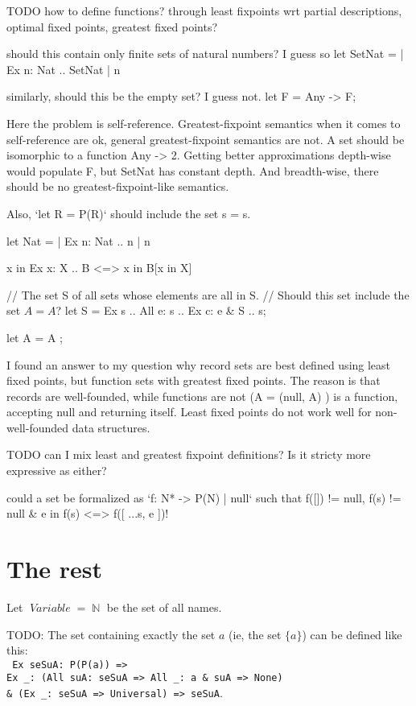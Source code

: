 \documentclass[oneside,12pt]{book}
\newcounter{question}
\theoremstyle{definition}
\theoremstyle{remark}
\newcommand{\tde}{\raisebox{0.5ex}{\texttildelow}}
\newcommand\var[1]{\mathop{\mathit{#1}}\nolimits}
\newcommand{\Variable}{\var{Variable}}
\newcommand{\Nat}{\var{\mathbb{N}}}
\begin{document}
TODO how to define functions?
through least fixpoints wrt partial descriptions, optimal fixed points,
greatest fixed points?

should this contain only finite sets of natural numbers? I guess so
let SetNat = {{}} | Ex n: Nat .. { SetNat | { n } }

similarly, should this be the empty set? I guess not.
let F = Any -> F;

Here the problem is self-reference. Greatest-fixpoint semantics when it comes
to self-reference are ok, general greatest-fixpoint semantics are not.
A set should be isomorphic to a function Any -> 2. Getting better approximations
depth-wise would populate F, but SetNat has constant depth. And breadth-wise,
there should be no greatest-fixpoint-like semantics.

Also, `let R = P(R)` should include the set s = {s}.

let Nat = {{}} | Ex n: Nat .. n | { n }

x in Ex x: X .. B <=> x in B[x in X]

// The set S of all sets whose elements are all in S.
// Should this set include the set $A = {A}$?
let S = Ex s .. All e: s .. Ex c: { e } \& S .. s;

let A = { A };

I found an answer to my question why record sets are best defined
using least fixed points, but function sets with greatest fixed points.
The reason is that records are well-founded, while functions are not
(A = { (null, A) }) is a function, accepting null and returning itself.
Least fixed points do not work well for non-well-founded data structures.

TODO can I mix least and greatest fixpoint definitions? Is it stricty more
expressive as either?

could a set be formalized as `f: N* -> P(N) | null` such that
f([]) != null,
f(s) != null \& e in f(s) <=> f([ ...s, e ])!

\section{The rest}

\begin{defBox}
  Let $\Variable = \Nat$ be the set of all names.
\end{defBox}

TODO: The set containing exactly the set $a$ (ie, the set $\{ a \}$) can be defined
like this: \\ \texttt{%
  Ex seSuA: P(P(a)) => \\ \phantom{a}
  Ex \_: (All suA: seSuA => All \_: a \& \tde suA => None) \\ \phantom{aaa}
  \& (Ex \_: seSuA => Universal) => seSuA}.
\end{document}

